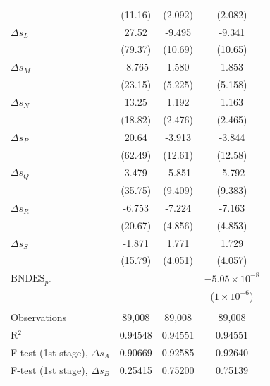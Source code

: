 \begin{tabular}{lccc}
                                     & (11.16)       & (2.092)       & (2.082)\\   
   $\Delta s_L$                      & 27.52         & -9.495        & -9.341\\   
                                     & (79.37)       & (10.69)       & (10.65)\\   
   $\Delta s_M$                      & -8.765        & 1.580         & 1.853\\   
                                     & (23.15)       & (5.225)       & (5.158)\\   
   $\Delta s_N$                      & 13.25         & 1.192         & 1.163\\   
                                     & (18.82)       & (2.476)       & (2.465)\\   
   $\Delta s_P$                      & 20.64         & -3.913        & -3.844\\   
                                     & (62.49)       & (12.61)       & (12.58)\\   
   $\Delta s_Q$                      & 3.479         & -5.851        & -5.792\\   
                                     & (35.75)       & (9.409)       & (9.383)\\   
   $\Delta s_R$                      & -6.753        & -7.224        & -7.163\\   
                                     & (20.67)       & (4.856)       & (4.853)\\   
   $\Delta s_S$                      & -1.871        & 1.771         & 1.729\\   
                                     & (15.79)       & (4.051)       & (4.057)\\   
   $\text{BNDES}_{pc}$               &               &               & $-5.05\times 10^{-8}$\\    
                                     &               &               & ($1\times 10^{-6}$)\\    
    \\
   Observations                      & 89,008        & 89,008        & 89,008\\  
   R$^2$                             & 0.94548       & 0.94551       & 0.94551\\  
   F-test (1st stage), $\Delta s_A$  & 0.90669       & 0.92585       & 0.92640\\  
   F-test (1st stage), $\Delta s_B$  & 0.25415       & 0.75200       & 0.75139\\  

\end{tabular}
